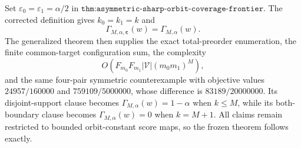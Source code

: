 Set \(\varepsilon_0=\varepsilon_1=\alpha/2\) in \(\texttt{thm:asymmetric-sharp-orbit-coverage-frontier}\). The corrected definition gives \(k_0=k_1=k\) and
\[
\Gamma_{M,\alpha,\boldsymbol\varepsilon}(w)=\Gamma_{M,\alpha}(w).
\]
The generalized theorem then supplies the exact total-preorder enumeration, the finite common-target configuration sum, the complexity
\[
O\!\left(F_{m_0}F_{m_1}|\mathcal V|(m_0m_1)^M\right),
\]
and the same four-pair symmetric counterexample with objective values \(24957/160000\) and \(759109/5000000\), whose difference is \(83189/20000000\). Its disjoint-support clause becomes \(\Gamma_{M,\alpha}(w)=1-\alpha\) when \(k\le M\), while its both-boundary clause becomes \(\Gamma_{M,\alpha}(w)=0\) when \(k=M+1\). All claims remain restricted to bounded orbit-constant score maps, so the frozen theorem follows exactly.